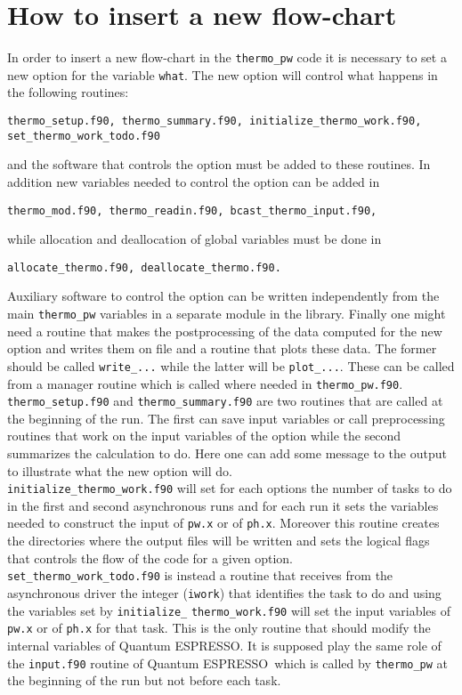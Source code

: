 \documentclass[12pt,a4paper]{article}
\def\qe{{\sc Quantum ESPRESSO}}
\begin{document}
\newpage
\section{\color{coral}How to insert a new flow-chart}
In order to insert a new flow-chart in the \texttt{thermo\_pw} code it
is necessary to set a new option for the variable \texttt{what}. The
new option will control what happens in the following routines:
\begin{verbatim}
thermo_setup.f90, thermo_summary.f90, initialize_thermo_work.f90, set_thermo_work_todo.f90
\end{verbatim}
and the software that controls the option must be added to these routines.
In addition new variables needed to control the option can be added
in 
\begin{verbatim}
thermo_mod.f90, thermo_readin.f90, bcast_thermo_input.f90,
\end{verbatim}
while allocation and deallocation of global variables must be done
in 
\begin{verbatim}
allocate_thermo.f90, deallocate_thermo.f90.
\end{verbatim}
Auxiliary software to control the option can be written independently
from the main \texttt{thermo\_pw} variables in a separate
module in the library. Finally one might need a routine that makes the
postprocessing of the data computed for the new option and writes them on
file and a routine that plots these data. The former should be called 
\texttt{write\_...} while the latter will be \texttt{plot\_...}.
These can be called from a manager routine which is called where needed
in \texttt{thermo\_pw.f90}. \\
\texttt{thermo\_setup.f90} and \texttt{thermo\_summary.f90} are two routines 
that are called at the beginning of the run. The first
can save input variables or call preprocessing routines that work on 
the input variables of the option while the second summarizes the 
calculation to do. Here one can add some message to the output to 
illustrate what the new option will do. \\ 
\texttt{initialize\_thermo\_work.f90} will set for each options the
number of tasks to do in the first and second asynchronous runs and
for each run it sets the variables needed to construct the
input of \texttt{pw.x} or of \texttt{ph.x}. Moreover this routine creates
the directories where the output files will be written and sets the
logical flags that controls the flow of the code for a given option. \\
\texttt{set\_thermo\_work\_todo.f90} is instead a routine that receives
from the asynchronous driver the integer (\texttt{iwork}) that identifies
the task to do and using the variables set by
\texttt{initialize\_} \texttt{thermo\_work.f90} will set the input variables
of \texttt{pw.x} or of \texttt{ph.x} for that task. This is the only 
routine that should modify the internal variables of \qe. It is supposed
play the same role of the \texttt{input.f90} routine of \qe\  
which is called by \texttt{thermo\_pw} at the beginning of the run
but not before each task.
\end{document}
